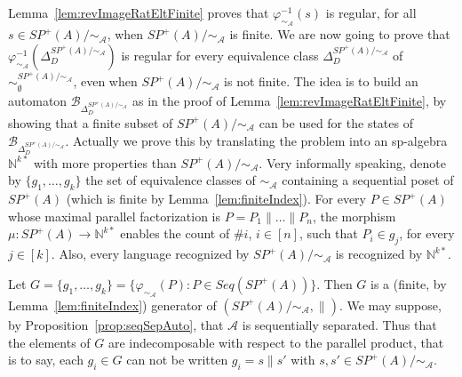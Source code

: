 \documentclass{CSML}
\begin{document}
Lemma~\ref{lem:revImageRatEltFinite} proves that  $\varphi^{-1}_{\sim_\mathcal{A}}(s)$ is regular, for all $s\in SP^+(A)/\mathord\sim_\mathcal{A}$, when $SP^+(A)/\mathord\sim_\mathcal{A}$ is finite. We are now going to prove that $\varphi^{-1}_{\sim_\mathcal{A}}(\Delta_D^{SP^+(A)/\mathord\sim_\mathcal{A}})$ is regular for every equivalence class $\Delta_D^{SP^+(A)/\mathord\sim_\mathcal{A}}$ of  $\sim_\emptyset^{SP^+(A)/\mathord\sim_\mathcal{A}}$, even when $SP^+(A)/\mathord\sim_\mathcal{A}$ is not finite. The idea is to build an automaton $\mathcal{B}_{\Delta_D^{SP^+(A)/\mathord\sim_\mathcal{A}}}$ as in the proof of Lemma~\ref{lem:revImageRatEltFinite}, by showing that a finite subset of $SP^+(A)/\mathord\sim_\mathcal{A}$ can be used for the states of $\mathcal{B}_{\Delta_D^{SP^+(A)/\mathord\sim_\mathcal{A}}}$. Actually we prove this by translating the problem into an sp-algebra $\mathbb{N}^{k*}$ with more properties than $SP^+(A)/\mathord\sim_\mathcal{A}$. Very informally speaking, denote by $\{g_1,\dots,g_k\}$ the set of equivalence classes of $\sim_\mathcal{A}$ containing a sequential poset of $SP^+(A)$ (which is finite by Lemma~\ref{lem:finiteIndex}). For every $P\in SP^+(A)$ whose maximal parallel factorization is $P=P_1\parallel\dots\parallel P_n$, the morphism $\mu:SP^+(A)\to\mathbb{N}^{k*}$ enables the count of $\#i$, $i\in[n]$, such that $P_i\in g_j$, for every $j\in[k]$. Also, every language recognized by $SP^+(A)/\mathord\sim_\mathcal{A}$ is recognized by $\mathbb{N}^{k*}$.

\medskip

Let $G=\{g_1,\dots,g_k\}=\{ \varphi_{\sim_\mathcal{A}}(P) : P\in Seq(SP^+(A))\}$. Then $G$ is a (finite, by Lemma~\ref{lem:finiteIndex}) generator of $(SP^+(A)/\mathord\sim_\mathcal{A},\parallel)$. We may suppose, by Proposition~\ref{prop:seqSepAuto}, that $\mathcal{A}$ is sequentially separated. Thus that 
the elements of $G$ are indecomposable with respect to the parallel product, that is to say, each $g_i\in G$ can not be written $g_i=s\parallel s'$ with $s,s'\in SP^+(A)/\mathord\sim_\mathcal{A}$.
\end{document}
